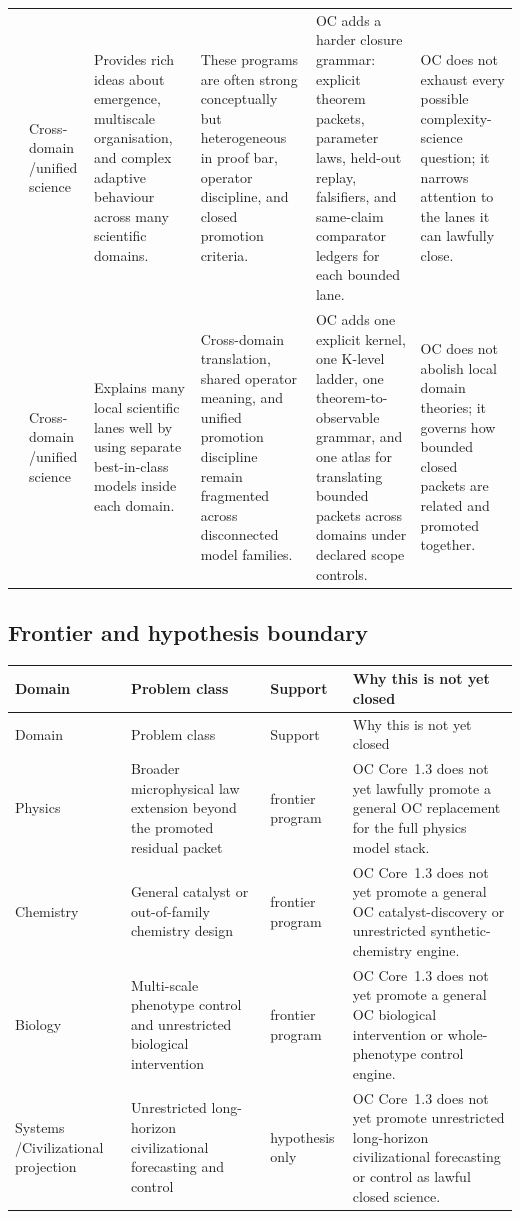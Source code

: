 \begin{longtable}{@{}L{0.17\textwidth}L{0.09\textwidth}L{0.17\textwidth}L{0.17\textwidth}L{0.20\textwidth}L{0.14\textwidth}@{}}
 & Cross-domain /\allowbreak unified science & Provides rich ideas about emergence, multiscale organisation, and complex adaptive behaviour across many scientific domains. & These programs are often strong conceptually but heterogeneous in proof bar, operator discipline, and closed promotion criteria. & OC adds a harder closure grammar: explicit theorem packets, parameter laws, held-out replay, falsifiers, and same-claim comparator ledgers for each bounded lane. & OC does not exhaust every possible complexity-science question; it narrows attention to the lanes it can lawfully close. \\
 & Cross-domain /\allowbreak unified science & Explains many local scientific lanes well by using separate best-in-class models inside each domain. & Cross-domain translation, shared operator meaning, and unified promotion discipline remain fragmented across disconnected model families. & OC adds one explicit kernel, one K-level ladder, one theorem-to-observable grammar, and one atlas for translating bounded packets across domains under declared scope controls. & OC does not abolish local domain theories; it governs how bounded closed packets are related and promoted together. \\
\bottomrule
\end{longtable}

\subsection{Frontier and hypothesis boundary}
\begin{longtable}{@{}L{0.11\textwidth}L{0.19\textwidth}L{0.14\textwidth}L{0.48\textwidth}@{}}
\toprule
Domain & Problem class & Support & Why this is not yet closed \\
\midrule
\endfirsthead
\toprule
Domain & Problem class & Support & Why this is not yet closed \\
\midrule
\endhead
Physics & Broader microphysical law extension beyond the promoted residual packet & frontier program & OC Core~1.3 does not yet lawfully promote a general OC replacement for the full physics model stack. \\
Chemistry & General catalyst or out-of-family chemistry design & frontier program & OC Core~1.3 does not yet promote a general OC catalyst-discovery or unrestricted synthetic-chemistry engine. \\
Biology & Multi-scale phenotype control and unrestricted biological intervention & frontier program & OC Core~1.3 does not yet promote a general OC biological intervention or whole-phenotype control engine. \\
Systems /\allowbreak Civili\allowbreak{}zational\allowbreak{} projection & Unrestricted long-horizon civilizational forecasting and control & hypothesis only & OC Core~1.3 does not yet promote unrestricted long-horizon civilizational forecasting or control as lawful closed science. \\
\bottomrule
\end{longtable}
\endgroup
